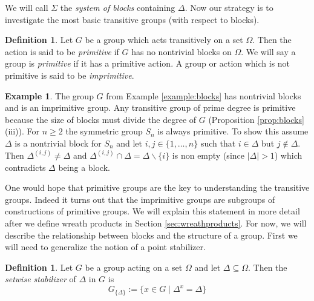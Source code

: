 \documentclass[]{article}
\theoremstyle{definition}
\newtheorem{defn}[thm]{Definition}
\newtheorem{example}[thm]{Example}
\begin{document}
We will call $\Sigma$ the \emph{system of blocks} containing $\Delta$. Now our strategy is to investigate the most basic transitive groups (with respect to blocks). 

\begin{defn} \label{defn:primitive} 
	Let $G$ be a group which acts transitively on a set $\Omega$. Then the action is said to be \emph{primitive} if $G$ has no nontrivial blocks on $\Omega$. We will say a group is \emph{primitive} if it has a primitive action. A group or action which is not primitive is said to be \emph{imprimitive}.
\end{defn}

\begin{example} \label{ex:blocks}
	The group $G$ from Example \ref{example:blocks} has nontrivial blocks and is an imprimitive group. Any transitive group of prime degree is primitive because the size of blocks must divide the degree of $G$ (Proposition \ref{prop:blocks}(iii)). For $n \geq 2$ the symmetric group $S_n$ is always primitive. To show this assume $\Delta$ is a nontrivial block for $S_n$ and let $i,j \in \{1,\dots, n\}$ such that $i \in \Delta$ but $j \notin \Delta$. Then $\Delta^{(i,j)} \neq \Delta$ and $\Delta^{(i,j)} \cap \Delta = \Delta \backslash \{i\}$ is non empty (since $|\Delta| > 1$) which contradicts $\Delta$ being a block.
\end{example}

One would hope that primitive groups are the key to understanding the transitive groups. Indeed it turns out that the imprimitive groups are subgroups of constructions of primitive groups. We will explain this statement in more detail after we define wreath products in Section \ref{sec:wreathproducts}. For now, we will describe the relationship between blocks and the structure of a group. First we will need to generalize the notion of a point stabilizer.

\begin{defn} \label{defn:setwisestab}
Let $G$ be a group acting on a set $\Omega$ and let $\Delta \subseteq \Omega$. Then the \emph{setwise stabilizer} of $\Delta$ in $G$ is
$$G_{\{ \Delta \}} := \{x \in G \; | \; \Delta^x = \Delta \} $$
\end{defn}
\end{document}
